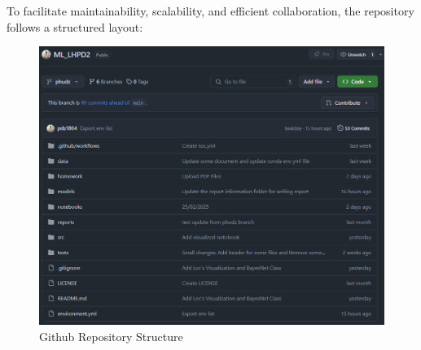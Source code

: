 To facilitate maintainability, scalability, and efficient collaboration, the repository follows a structured layout:

\begin{figure}[H]
    \centering
    \includegraphics[width=\textwidth]{img/progress/github_repo.PNG}
    \caption{Github Repository Structure}
    \label{fig:github-repo}
\end{figure}

\newpage
